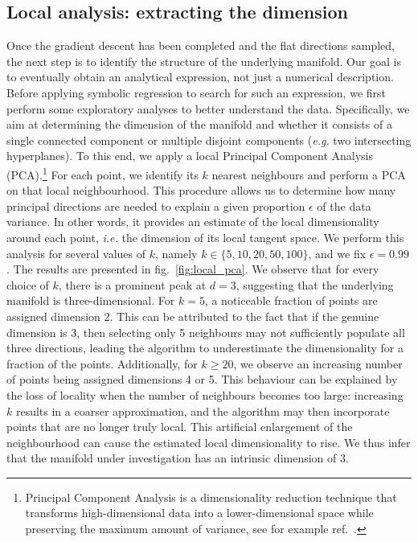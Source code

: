 \documentclass[11pt,a4paper]{article}
\begin{document}
	\subsection{Local analysis: extracting the dimension}
	Once the gradient descent has been completed and the flat directions sampled, the next step is to identify the structure of the underlying manifold. Our goal is to eventually obtain an analytical expression, not just a numerical description. Before applying symbolic regression to search for such an expression, we first perform some exploratory analyses to better understand the data. Specifically, we aim at determining the dimension of the manifold and whether it consists of a single connected component or multiple disjoint components (\textit{e.g.} two intersecting hyperplanes). To this end, we apply a local Principal Component Analysis (PCA).\footnote{Principal Component Analysis is a dimensionality reduction technique that transforms high-dimensional data into a lower-dimensional space while preserving the maximum amount of variance, see for example ref.~\cite{scikit-learn}.} %
	For each point, we identify its $k$ nearest neighbours and perform a PCA on that local neighbourhood. This procedure allows us to determine how many principal directions are needed to explain a given proportion $\epsilon$ of the data variance. In other words, it provides an estimate of the local dimensionality around each point, \textit{i.e.} the dimension of its local tangent space. We perform this analysis for several values of $k$, namely $k \in \{5, 10, 20, 50, 100\}$, and we fix $\epsilon = 0.99$. The results are presented in fig.~\ref{fig:local_pca}. We observe that for every choice of $k$, there is a prominent peak at $d = 3$, suggesting that the underlying manifold is three-dimensional. For $k = 5$, a noticeable fraction of points are assigned dimension 2. This can be attributed to the fact that if the genuine dimension is 3, then selecting only 5 neighbours may not sufficiently populate all three directions, leading the algorithm to underestimate the dimensionality for a fraction of the points. Additionally, for $k \geq 20$, we observe an increasing number of points being assigned dimensions 4 or 5. This behaviour can be explained by the loss of locality when the number of neighbours becomes too large: increasing $k$ results in a coarser approximation, and the algorithm may then incorporate points that are no longer truly local. This artificial enlargement of the neighbourhood can cause the estimated local dimensionality to rise. We thus infer that the manifold under investigation has an intrinsic dimension of 3.
\end{document}
